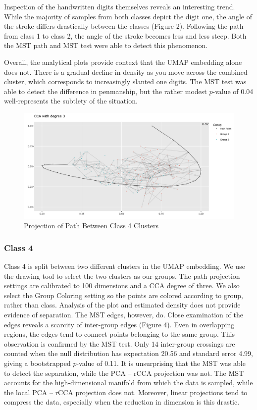 \documentclass{article}
\begin{document}
Inspection of the handwritten digits themselves reveals an interesting trend. While the majority of samples from both classes depict the digit one, the angle of the stroke differs drastically between the classes (Figure 2). Following the path from class 1 to class 2, the angle of the stroke becomes less and less steep. Both the MST path and MST test were able to detect this phenomenon.

Overall, the analytical plots provide context that the UMAP embedding alone does not. There is a gradual decline in density as you move across the combined cluster, which corresponds to increasingly slanted one digits. The MST test was able to detect the difference in penmanship, but the rather modest $p$-value of 0.04 well-represents the subtlety of the situation.

\renewcommand{\figurename}{Figure}
\renewcommand{\thefigure}{4}
\begin{figure}[!b]
\centering
\includegraphics[scale=0.35]{class 4 projection}
\caption{Projection of Path Between Class 4 Clusters}
\end{figure}

\subsubsection{Class 4}
Class 4 is split between two different clusters in the UMAP embedding. We use the drawing tool to select the two clusters as our groups. The path projection settings are calibrated to 100 dimensions and a CCA degree of three. We also select the Group Coloring setting so the points are colored according to group, rather than class. Analysis of the plot and estimated density does not provide evidence of separation. The MST edges, however, do. Close examination of the edges reveals a scarcity of inter-group edges (Figure 4). Even in overlapping regions, the edges tend to connect points belonging to the same group. This observation is confirmed by the MST test. Only 14 inter-group crossings are counted when the null distribution has expectation 20.56 and standard error 4.99, giving a bootstrapped $p$-value of 0.11. It is unsurprising that the MST was able to detect the separation, while the PCA -- rCCA projection was not. The MST accounts for the high-dimensional manifold from which the data is sampled, while the local PCA -- rCCA projection does not. Moreover, linear projections tend to compress the data, especially when the reduction in dimension is this drastic.
\end{document}
